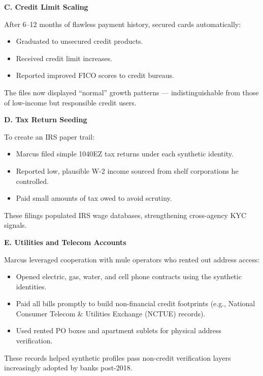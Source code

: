 \medskip

\textbf{C. Credit Limit Scaling}

After 6--12 months of flawless payment history, secured cards automatically:

\begin{itemize}
    \item Graduated to unsecured credit products.
    \item Received credit limit increases.
    \item Reported improved FICO scores to credit bureaus.
\end{itemize}

The files now displayed ``normal'' growth patterns --- indistinguishable from those of low-income but responsible credit users.

\medskip

\textbf{D. Tax Return Seeding}

To create an IRS paper trail:

\begin{itemize}
    \item Marcus filed simple 1040EZ tax returns under each synthetic identity.
    \item Reported low, plausible W-2 income sourced from shelf corporations he controlled.
    \item Paid small amounts of tax owed to avoid scrutiny.
\end{itemize}

These filings populated IRS wage databases, strengthening cross-agency KYC signals.

\medskip

\textbf{E. Utilities and Telecom Accounts}

Marcus leveraged cooperation with mule operators who rented out address access:

\begin{itemize}
    \item Opened electric, gas, water, and cell phone contracts using the synthetic identities.
    \item Paid all bills promptly to build non-financial credit footprints (e.g., National Consumer Telecom \& Utilities Exchange (NCTUE) records).
    \item Used rented PO boxes and apartment sublets for physical address verification.
\end{itemize}

These records helped synthetic profiles pass non-credit verification layers increasingly adopted by banks post-2018.

